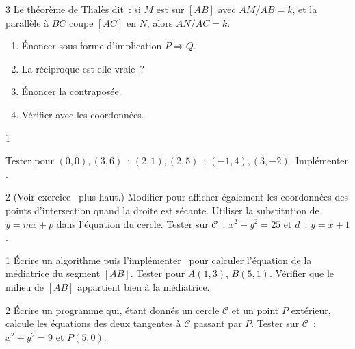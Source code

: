 \begin{exo}{3}
Le th\'eor\`eme de Thal\`es dit~: si $M$ est sur $[AB]$ avec $AM/AB=k$,
et la parall\`ele \`a $BC$ coupe $[AC]$ en $N$, alors $AN/AC=k$.
\begin{enumerate}
  \item \'Enoncer sous forme d'implication $P\Rightarrow Q$.
  \item La r\'eciproque est-elle vraie~?
  \item \'Enoncer la contrapos\'ee.
  \item V\'erifier avec les coordonn\'ees.
\end{enumerate}
\end{exo}

\begin{exo}{1}

\begin{algorithm}[H]
\caption{\'Equation de la droite $AB$}
\end{algorithm}

Tester pour $(0,0),(3,6)$~; $(2,1),(2,5)$~; $(-1,4),(3,-2)$.
Impl\'ementer \computer.
\end{exo}

\begin{exo}{2}
(Voir exercice \logicoalgo\ plus haut.)
Modifier pour afficher \'egalement les coordonn\'ees des points d'intersection
quand la droite est s\'ecante.
Utiliser la substitution de $y=mx+p$ dans l'\'equation du cercle.
Tester sur $\mathcal{C}$~: $x^2+y^2=25$ et $d$~: $y=x+1$.
\end{exo}

\begin{exo}{1}
\'Ecrire un algorithme puis l'impl\'ementer \computer\ pour calculer
l'\'equation de la m\'ediatrice du segment $[AB]$.
Tester pour $A(1,3)$, $B(5,1)$.
V\'erifier que le milieu de $[AB]$ appartient bien \`a la m\'ediatrice.
\end{exo}

\begin{exo}{2}
\'Ecrire un programme qui, \'etant donn\'es un cercle $\mathcal{C}$ et un point $P$
ext\'erieur, calcule les \'equations des deux tangentes \`a $\mathcal{C}$ passant par $P$.
Tester sur $\mathcal{C}$~: $x^2+y^2=9$ et $P(5,0)$.
\end{exo}

